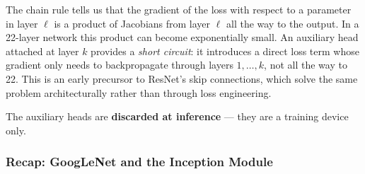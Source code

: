 \documentclass[11pt,a4paper]{article}
\begin{document}
\begin{insightbox}
The chain rule tells us that the gradient of the loss with respect to a parameter in layer $\ell$
is a product of Jacobians from layer $\ell$ all the way to the output.  In a 22-layer network
this product can become exponentially small.  An auxiliary head attached at layer $k$
provides a \emph{short circuit}: it introduces a direct loss term whose gradient only needs to
backpropagate through layers $1, \ldots, k$, not all the way to 22.  This is an early
precursor to ResNet's skip connections, which solve the same problem architecturally rather
than through loss engineering.

The auxiliary heads are \textbf{discarded at inference} — they are a training device only.
\end{insightbox}

\subsubsection{Recap: GoogLeNet and the Inception Module}
\end{document}
